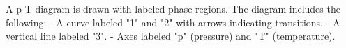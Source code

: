 A p-T diagram is drawn with labeled phase regions. The diagram includes the following:  
- A curve labeled "1" and "2" with arrows indicating transitions.  
- A vertical line labeled "3".  
- Axes labeled "p" (pressure) and "T" (temperature).